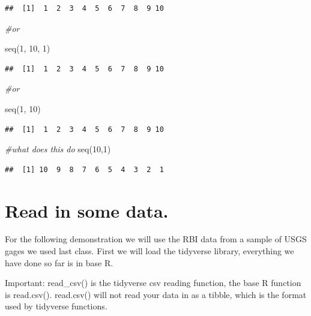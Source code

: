 \documentclass[
]{book}
\newenvironment{Shaded}{\begin{snugshade}}{\end{snugshade}}
\newcommand{\CommentTok}[1]{\textcolor[rgb]{0.56,0.35,0.01}{\textit{#1}}}
\newcommand{\DecValTok}[1]{\textcolor[rgb]{0.00,0.00,0.81}{#1}}
\newcommand{\FunctionTok}[1]{\textcolor[rgb]{0.00,0.00,0.00}{#1}}
\newcommand{\NormalTok}[1]{#1}
\begin{document}
\begin{verbatim}
##  [1]  1  2  3  4  5  6  7  8  9 10
\end{verbatim}

\begin{Shaded}
\begin{Highlighting}[]
\CommentTok{\#or}

\FunctionTok{seq}\NormalTok{(}\DecValTok{1}\NormalTok{, }\DecValTok{10}\NormalTok{, }\DecValTok{1}\NormalTok{)}
\end{Highlighting}
\end{Shaded}

\begin{verbatim}
##  [1]  1  2  3  4  5  6  7  8  9 10
\end{verbatim}

\begin{Shaded}
\begin{Highlighting}[]
\CommentTok{\#or}

\FunctionTok{seq}\NormalTok{(}\DecValTok{1}\NormalTok{, }\DecValTok{10}\NormalTok{)}
\end{Highlighting}
\end{Shaded}

\begin{verbatim}
##  [1]  1  2  3  4  5  6  7  8  9 10
\end{verbatim}

\begin{Shaded}
\begin{Highlighting}[]
\CommentTok{\#what does this do}
\FunctionTok{seq}\NormalTok{(}\DecValTok{10}\NormalTok{,}\DecValTok{1}\NormalTok{)}
\end{Highlighting}
\end{Shaded}

\begin{verbatim}
##  [1] 10  9  8  7  6  5  4  3  2  1
\end{verbatim}

\hypertarget{read-in-some-data.}{%
\section{Read in some data.}\label{read-in-some-data.}}

For the following demonstration we will use the RBI data from a sample of USGS gages we used last class. First we will load the tidyverse library, everything we have done so far is in base R.

Important: read\_csv() is the tidyverse csv reading function, the base R function is read.csv(). read.csv() will not read your data in as a tibble, which is the format used by tidyverse functions.
\end{document}
